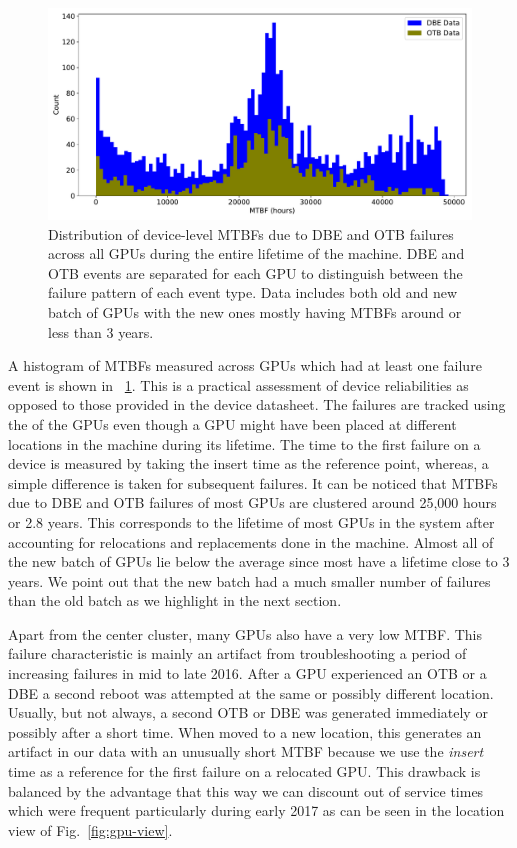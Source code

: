 \begin{figure}[bt]
  \begin{center}
    \includegraphics[trim={0 1em 0 1em},clip,width=\columnwidth]{figs/MTBF_GPUwise.pdf}
  \end{center}
  \caption{Distribution of device-level MTBFs due to DBE and OTB failures across all GPUs during the
entire lifetime of the machine. DBE and OTB events are separated for each GPU to distinguish between 
the failure pattern of each event type. Data includes both old and new batch of GPUs with the new ones 
mostly having MTBFs around or less than 3 years.}
  \label{fig:Device_MTBFs}
\end{figure}
A histogram of MTBFs measured across GPUs which had at least one failure event is shown 
in ~\ref{fig:Device_MTBFs}. This is a practical assessment of device reliabilities 
as opposed to those provided in the device datasheet. The failures are tracked using the
 of the GPUs even though a GPU might have been placed at different locations in the 
machine during its lifetime. The time to the first failure on a device is measured by taking
the insert time as the reference point, whereas, a simple difference is taken for subsequent
failures. It can be noticed that MTBFs due to DBE and OTB failures of most GPUs are clustered around 
25,000 hours or 2.8 years. This corresponds to the lifetime of most GPUs in the system after accounting 
for relocations and replacements done in the machine. Almost all of the new batch of GPUs lie below 
the average since most have a lifetime close to 3 years. We point out
that the new batch had a much smaller number of failures than
the old batch as we highlight in the next section.

Apart from the center cluster, many GPUs also have a very 
low MTBF. This failure characteristic is mainly an artifact from
troubleshooting a period of increasing failures in mid to late 2016.
After a GPU experienced an OTB or a DBE a second reboot was attempted at
the same or possibly different location. Usually, but not always, a
second OTB or DBE was generated immediately or possibly after a short
time. When moved to a new location, this generates an artifact in our
data with an unusually short MTBF because we use the {\em insert} time as
a reference for the first failure on a relocated GPU. This drawback is
balanced by the advantage that this way we can discount out of service times
which were frequent particularly during early 2017 as can be seen in
the location view of Fig.~\ref{fig:gpu-view}.

